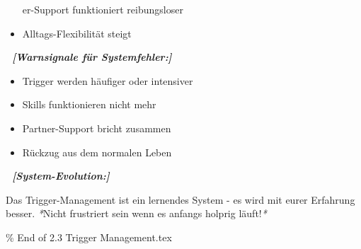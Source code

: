 \begin{itemize}
er-Support funktioniert reibungsloser
\item   Alltags-Flexibilität steigt
\end{itemize}

\textbf{🚨 \textit{[Warnsignale für Systemfehler:]}}

\begin{itemize}
\item   Trigger werden häufiger oder intensiver
\item   Skills funktionieren nicht mehr
\item   Partner-Support bricht zusammen
\item   Rückzug aus dem normalen Leben
\end{itemize}

\textbf{🔄 \textit{[System-Evolution:]}}

Das \textcolor{ctmmRed}{Trigger}-Management ist ein lernendes System - es wird mit eurer
Erfahrung besser. \textit{*}Nicht frustriert sein wenn es anfangs holprig
läuft!\textit{*}

\% End of 2.3 Trigger Management.tex
